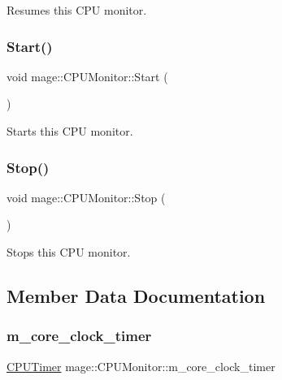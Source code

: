 Resumes this C\+PU monitor. \hypertarget{classmage_1_1_c_p_u_monitor_a3f88acbb979f47309fd46f1b507fed09}{}\label{classmage_1_1_c_p_u_monitor_a3f88acbb979f47309fd46f1b507fed09} 
\subsubsection{\texorpdfstring{Start()}{Start()}}
{\footnotesize\ttfamily void mage\+::\+C\+P\+U\+Monitor\+::\+Start (\begin{DoxyParamCaption}{ }\end{DoxyParamCaption})\hspace{0.3cm}{\ttfamily [noexcept]}}

Starts this C\+PU monitor. \hypertarget{classmage_1_1_c_p_u_monitor_a133aaed1df0e84486a6fc748d66615bb}{}\label{classmage_1_1_c_p_u_monitor_a133aaed1df0e84486a6fc748d66615bb} 
\subsubsection{\texorpdfstring{Stop()}{Stop()}}
{\footnotesize\ttfamily void mage\+::\+C\+P\+U\+Monitor\+::\+Stop (\begin{DoxyParamCaption}{ }\end{DoxyParamCaption})\hspace{0.3cm}{\ttfamily [noexcept]}}

Stops this C\+PU monitor. 

\subsection{Member Data Documentation}
\hypertarget{classmage_1_1_c_p_u_monitor_a245b920ef7e6703087b47ad370cb3bbb}{}\label{classmage_1_1_c_p_u_monitor_a245b920ef7e6703087b47ad370cb3bbb} 
\subsubsection{\texorpdfstring{m\+\_\+core\+\_\+clock\+\_\+timer}{m\_core\_clock\_timer}}
{\footnotesize\ttfamily \hyperlink{namespacemage_a1032d81f22079b7190cac3bf14136068}{C\+P\+U\+Timer} mage\+::\+C\+P\+U\+Monitor\+::m\+\_\+core\+\_\+clock\+\_\+timer\hspace{0.3cm}{\ttfamily [private]}}

